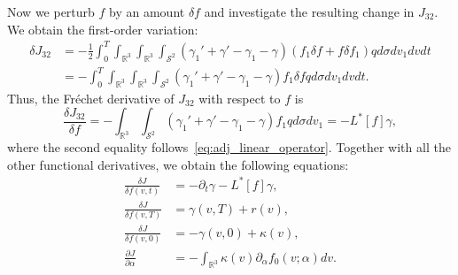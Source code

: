 \documentclass[times,final,nopreprintline]{elsarticle}
\newcommand{\bbR}{\mathbb R} \newcommand{\bbS}{\mathbb S}
\newcommand{\cS}{\mathcal S} \newcommand{\cT}{\mathcal T}
\newcommand{\Rthree}{{\bbR^3}}
\newcommand{\Stwo}{{\cS^2}}
\begin{document}
Now we perturb $f$ by an amount $\delta f$ and investigate the resulting change in $J_{32}$. We obtain the first-order variation:
\begin{align*}
\delta J_{32}&=-\frac{1}{2} \int_0^T \int_\Rthree \int_\Rthree \int_\Stwo(  \gamma_1' + \gamma' - \gamma_1 - \gamma)  ( f_1 \delta f+ f \delta f_1 ) q  d\sigma dv_1 dv dt   \nonumber \\
&=-    \int_0^T\int_\Rthree \int_\Rthree \int_\Stwo(  \gamma_1' + \gamma' - \gamma_1 - \gamma)   f_1 \delta f  q  d\sigma dv_1  dv dt. %
\end{align*}
Thus, the Fr\'echet derivative of $J_{32}$ with respect to $f$ is
\begin{equation*}
\frac{\delta J_{32} }{ \delta f }= -    \int_\Rthree \int_\Stwo  (  \gamma_1' + \gamma' - \gamma_1 - \gamma)   f_1   q  d\sigma dv_1  =  -L^*[f] \gamma,\end{equation*}
where the second equality follows~\eqref{eq:adj_linear_operator}.
Together with all the other functional derivatives, we obtain the following equations:
\begin{align*}
\frac{\delta J}{ \delta {f(v,t)}} &= - \partial_t  \gamma  - L^*[f] \gamma,\\
\frac{\delta J}{ \delta {f(v,T)}} &=\gamma(v,T) + r(v), \\
\frac{\delta J}{ \delta {f(v,0)} } &=  - \gamma(v,0) +\kappa(v),  \\
\frac{\partial J}{ \partial{\alpha} } &= -\int_\Rthree \kappa(v) \partial_\alpha f_0(v;\alpha) dv. 
\end{align*}
\end{document}
